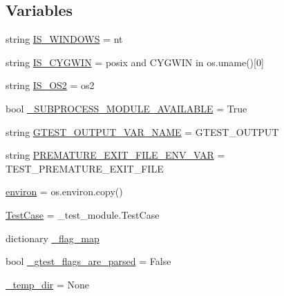 \subsection*{Variables}
\begin{DoxyCompactItemize}
\item 
string \mbox{\hyperlink{namespacegoogletest-master_1_1googletest_1_1test_1_1gtest__test__utils_a226979431c676d849e923b3eff36383a}{I\+S\+\_\+\+W\+I\+N\+D\+O\+WS}} = \textquotesingle{}nt\textquotesingle{}
\item 
string \mbox{\hyperlink{namespacegoogletest-master_1_1googletest_1_1test_1_1gtest__test__utils_a791250a80c836c012511b74970962b07}{I\+S\+\_\+\+C\+Y\+G\+W\+IN}} = \textquotesingle{}posix\textquotesingle{} and \textquotesingle{}C\+Y\+G\+W\+IN\textquotesingle{} in os.\+uname()\mbox{[}0\mbox{]}
\item 
string \mbox{\hyperlink{namespacegoogletest-master_1_1googletest_1_1test_1_1gtest__test__utils_aa84d660ac78118cdf2a6d90ed5b7e4c4}{I\+S\+\_\+\+O\+S2}} = \textquotesingle{}os2\textquotesingle{}
\item 
bool \mbox{\hyperlink{namespacegoogletest-master_1_1googletest_1_1test_1_1gtest__test__utils_a17e129d027d56f9c669a99cb0189f354}{\+\_\+\+S\+U\+B\+P\+R\+O\+C\+E\+S\+S\+\_\+\+M\+O\+D\+U\+L\+E\+\_\+\+A\+V\+A\+I\+L\+A\+B\+LE}} = True
\item 
string \mbox{\hyperlink{namespacegoogletest-master_1_1googletest_1_1test_1_1gtest__test__utils_ac0e7f2adc878fcbdf9de3eb6fdb6d94b}{G\+T\+E\+S\+T\+\_\+\+O\+U\+T\+P\+U\+T\+\_\+\+V\+A\+R\+\_\+\+N\+A\+ME}} = \textquotesingle{}G\+T\+E\+S\+T\+\_\+\+O\+U\+T\+P\+UT\textquotesingle{}
\item 
string \mbox{\hyperlink{namespacegoogletest-master_1_1googletest_1_1test_1_1gtest__test__utils_a38fa9a52e870b01501b88879fe173eff}{P\+R\+E\+M\+A\+T\+U\+R\+E\+\_\+\+E\+X\+I\+T\+\_\+\+F\+I\+L\+E\+\_\+\+E\+N\+V\+\_\+\+V\+AR}} = \textquotesingle{}T\+E\+S\+T\+\_\+\+P\+R\+E\+M\+A\+T\+U\+R\+E\+\_\+\+E\+X\+I\+T\+\_\+\+F\+I\+LE\textquotesingle{}
\item 
\mbox{\hyperlink{namespacegoogletest-master_1_1googletest_1_1test_1_1gtest__test__utils_a8d0afbf7286703b2a637fd3bdc86a5ff}{environ}} = os.\+environ.\+copy()
\item 
\mbox{\hyperlink{namespacegoogletest-master_1_1googletest_1_1test_1_1gtest__test__utils_a07aa51336528fd440633e31b91ad992a}{Test\+Case}} = \+\_\+test\+\_\+module.\+Test\+Case
\item 
dictionary \mbox{\hyperlink{namespacegoogletest-master_1_1googletest_1_1test_1_1gtest__test__utils_a6fe9dc62e92fced22f9d2875e6d1aad8}{\+\_\+flag\+\_\+map}}
\item 
bool \mbox{\hyperlink{namespacegoogletest-master_1_1googletest_1_1test_1_1gtest__test__utils_aa9474ff92ae907e92c30acd80da1a9b6}{\+\_\+gtest\+\_\+flags\+\_\+are\+\_\+parsed}} = False
\item 
\mbox{\hyperlink{namespacegoogletest-master_1_1googletest_1_1test_1_1gtest__test__utils_aa7e6f23a561783e19f836a7ec7055f2b}{\+\_\+temp\+\_\+dir}} = None
\end{DoxyCompactItemize}


